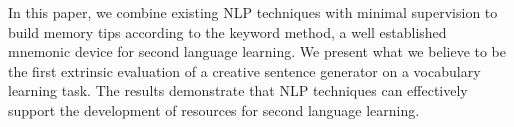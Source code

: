 In this paper, we combine existing NLP techniques with minimal supervision to build memory tips according to the keyword method, a well established mnemonic device for second language learning. We present what we believe to be the first extrinsic evaluation of a creative sentence generator on a vocabulary learning task. The results demonstrate that NLP techniques can effectively support the development of resources for second language learning.
